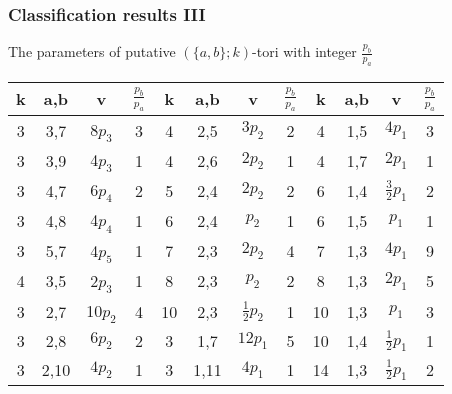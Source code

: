 \documentclass{beamer}
\begin{document}
\begin{frame}
  \frametitle{Classification results III}

The  parameters of putative $(\{a,b\};k)$-tori with integer $\frac{p_b}{p_a}$
\begin{center}
{\small
\begin{tabular}{||c|c|c|c||c|c|c|c||c|c|c|c||}
\hline\hline
 k  & a,b & v & $\frac{p_b}{p_a}$  & k  & a,b & v & $\frac{p_b}{p_a}$  & k  & a,b & v & $\frac{p_b}{p_a}$ \\
\hline
\hline
 3  & 3,7  & 8$p_3$  & 3 & 4  & 2,5  & $3p_2$           & 2 & 4  & 1,5  & $4p_1$  & 3\\
 3  & 3,9  & 4$p_3$  & 1 & 4  & 2,6  & $2p_2$           & 1 & 4  & 1,7  & $2p_1$  & 1\\
 3  & 4,7  & 6$p_4$  & 2 & 5  & 2,4  & $2p_2$           & 2 & 6  & 1,4  & $\frac{3}{2}p_1$ & 2\\
 3  & 4,8  & 4$p_4$  & 1 & 6  & 2,4  & $p_2$            & 1 & 6  & 1,5  & $p_1$   & 1\\
 3  & 5,7  & 4$p_5$  & 1 & 7  & 2,3  & $2p_2$           & 4 & 7  & 1,3  & $4p_1$  & 9\\
 4  & 3,5  & 2$p_3$  & 1 & 8  & 2,3  & $p_2$            & 2 & 8  & 1,3  & $2p_1$  & 5\\
 3  & 2,7  & 10$p_2$ & 4 & 10 & 2,3  & $\frac{1}{2}p_2$ & 1 & 10 & 1,3  & $p_1$   & 3\\
 3  & 2,8  & $6p_2$  & 2 & 3  & 1,7  & $12p_1$          & 5 & 10 & 1,4  & $\frac{1}{2}p_1$ & 1\\
 3  & 2,10 & $4p_2$  & 1 & 3  & 1,11 & $4p_1$           & 1 & 14 & 1,3  &$\frac{1}{2}p_1$ &2\\
\hline\hline
\end{tabular}
}
\end{center}
  

\end{frame}


  
\end{document}
